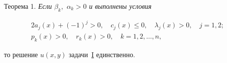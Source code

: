\smallskip



\hypertarget{abd:th1}{}



{\small\sc Теорема 1.} \it  Если ${\beta _k},$ ${\alpha _k} > 0$ и выполнены условия

\begin{gather}

2{a_j}(x) + {( - 1)^j} > 0,\quad  {c_j}(x) \le 0,\quad  {\lambda _j}(x) > 0,\quad j = 1, 2;

\label{eq:14.j}

\\

{p_k}(x) > 0,\quad {r_k}(x) > 0,\quad k = 1, 2, \dots, n, 

\label{eq:1.15}

\end{gather}

то решение $u(x,y)$ задачи~\hyperlink{abd:taskI}{\rm I} единственно\rm.



\rm



\smallskip



